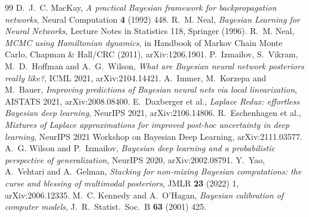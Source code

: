 \begin{thebibliography}{99}
 D.~J.~C. MacKay, \emph{A practical Bayesian framework for
  backpropagation networks}, Neural Computation \textbf{4} (1992) 448.
 R.~M. Neal, \emph{Bayesian Learning for Neural Networks}, Lecture Notes
  in Statistics 118, Springer (1996).
 R.~M. Neal, \emph{MCMC using Hamiltonian dynamics}, in Handbook of
  Markov Chain Monte Carlo, Chapman \& Hall/CRC (2011), arXiv:1206.1901.
 P.~Izmailov, S.~Vikram, M.~D.~Hoffman and A.~G.~Wilson, \emph{What
  are Bayesian neural network posteriors really like?}, ICML 2021, arXiv:2104.14421.
 A.~Immer, M.~Korzepa and M.~Bauer, \emph{Improving predictions of
  Bayesian neural nets via local linearization}, AISTATS 2021, arXiv:2008.08400.
 E.~Daxberger et al., \emph{Laplace Redux: effortless Bayesian
  deep learning}, NeurIPS 2021, arXiv:2106.14806.
 R.~Eschenhagen et al., \emph{Mixtures of Laplace approximations
  for improved post-hoc uncertainty in deep learning}, NeurIPS 2021 Workshop on Bayesian
  Deep Learning, arXiv:2111.03577.
 A.~G. Wilson and P.~Izmailov, \emph{Bayesian deep learning and a
  probabilistic perspective of generalization}, NeurIPS 2020, arXiv:2002.08791.
 Y.~Yao, A.~Vehtari and A.~Gelman, \emph{Stacking for non-mixing Bayesian
  computations: the curse and blessing of multimodal posteriors}, JMLR \textbf{23} (2022) 1,
  arXiv:2006.12335.
 M.~C. Kennedy and A.~O'Hagan, \emph{Bayesian calibration of computer
  models}, J.~R.~Statist.\ Soc.~B \textbf{63} (2001) 425.
\end{thebibliography}


